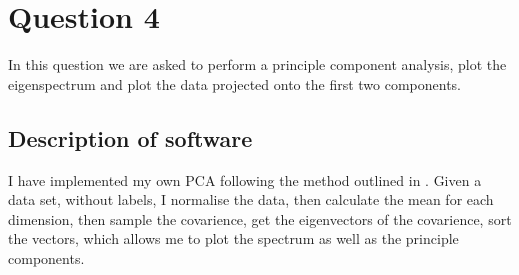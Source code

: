 \section{Question 4}
In this question we are asked to perform a principle component analysis, plot the eigenspectrum and plot the data projected onto the first two components.
\subsection{Description of software}\label{q4}
I have implemented my own PCA following the method outlined in \cite[chapter~12]{bishop}. Given a data set, without labels, I normalise the data, then calculate the mean for each dimension, then sample the covarience, get the eigenvectors of the covarience, sort the vectors, which allows me to plot the spectrum as well as the principle components.
